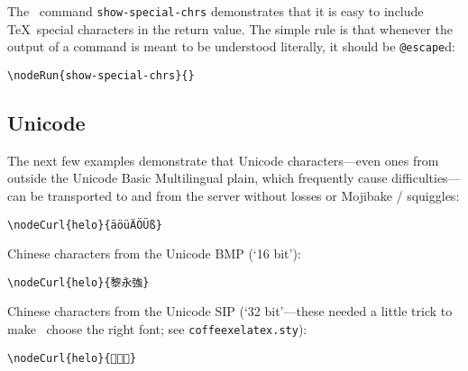The \CXLTX\ command \verb#show-special-chrs# demonstrates that it is easy to include \TeX\ special characters
in the return value. The simple rule is that whenever the output of a command is meant to be understood
literally, it should be \verb#@escape#d:

\begin{verbatim}
\nodeRun{show-special-chrs}{}
\end{verbatim}



\subsection{Unicode}\label{unicode}

The next few examples demonstrate that Unicode characters---even ones from outside the Unicode Basic
Multilingual plain, which frequently cause difficulties---can be transported to and from the server
without losses or Mojibake / squiggles:

\begin{verbatim}
\nodeCurl{helo}{äöüÄÖÜß}
\end{verbatim}


Chinese characters from the Unicode BMP (`16 bit'):

\begin{verbatim}
\nodeCurl{helo}{黎永強}
\end{verbatim}


Chinese characters from the Unicode SIP (`32 bit'---these needed a little trick to make \XeLaTeX\ choose
the right font; see \verb#coffeexelatex.sty#):

\begin{verbatim}
\nodeCurl{helo}{𠀀𠀐𠀙}
\end{verbatim}



